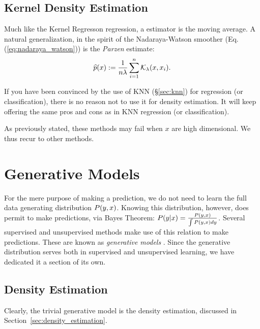 \subsection{Kernel Density Estimation}
\label{sec:kernel_density}

Much like the Kernel Regresson regression, a \naive estimator is the moving average.
A natural generalization, in the spirit of the Nadaraya-Watson smoother (Eq.(\ref{eq:nadaraya_watson})) is the \emph{Parzen} estimate:
\begin{align}
\label{eq:parzen}
	\widehat{p}(x):=\frac{1}{n \lambda} \sum_{i=1}^n \mathcal{K}_\lambda(x,x_i).
\end{align}

\begin{remark}
If you have been convinced by the use of KNN (\S\ref{sec:knn}) for regression (or classification), there is no reason not to use it for density estimation. It will keep offering the same pros and cons as in KNN regression (or classification).
\end{remark}

As previously stated, these methods may fail when $x$ are high dimensional. We thus recur to other methods.












\section{Generative Models}
\label{sec:generative}

For the mere purpose of making a prediction, we do not need to learn the full data generating distribution $P(y,x)$. 
Knowing this distribution, however, does permit to make predictions, via Bayes Theorem: 
$P(y|x)=\frac{P(y,x)}{\int P(y,x)dy}$.
Several supervised and unsupervised methods make use of this relation to make predictions. These are known as \emph{generative models} .
Since the generative distribution serves both in supervised and unsupervised learning, we have dedicated it a section of its own.




\subsection{Density Estimation}
Clearly, the trivial generative model is the density estimation, discussed in Section~\ref{sec:density_estimation}.


